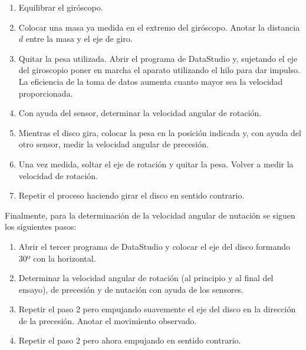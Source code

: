 \documentclass[a4paper]{article}
\begin{document}
\begin{enumerate}
\item Equilibrar el giróscopo.
\item Colocar una masa ya medida en el extremo del giróscopo. Anotar la distancia $d$ entre la masa y el eje de giro.
\item Quitar la pesa utilizada. Abrir el programa de DataStudio y, sujetando el eje del giroscopio poner en marcha el aparato utilizando el hilo para dar impulso. La eficiencia de la toma de datos aumenta cuanto mayor sea la velocidad proporcionada.
\item Con ayuda del sensor, determinar la velocidad angular de rotación.
\item Mientras el disco gira, colocar la pesa en la posición indicada y, con ayuda del otro sensor, medir la velocidad angular de precesión.
\item Una vez medida, soltar el eje de rotación y quitar la pesa. Volver a medir la velocidad de rotación. 
\item Repetir el proceso haciendo girar el disco en sentido contrario.
\end{enumerate}
Finalmente, para la determinación de la velocidad angular de nutación se siguen los siguientes pasos:
\begin{enumerate}
\item Abrir el tercer programa de DataStudio y colocar el eje del disco formando 30º con la horizontal.
\item Determinar la velocidad angular de rotación (al principio y al final del ensayo), de precesión y de nutación con ayuda de los sensores.
\item Repetir el paso 2 pero empujando suavemente el eje del disco en la dirección de la precesión. Anotar el movimiento observado.
\item Repetir el paso 2 pero ahora empujando en sentido contrario.
\end{enumerate}
\end{document}
